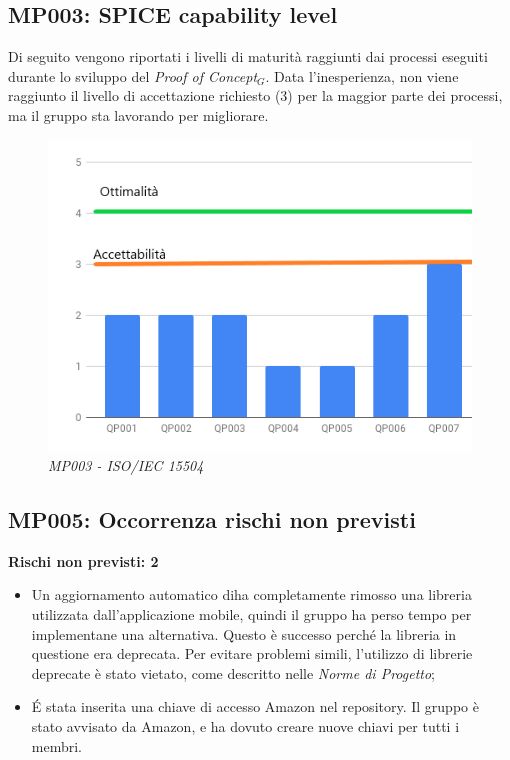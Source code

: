 \subsection{MP003: SPICE capability level}
Di seguito vengono riportati i livelli di maturità raggiunti dai processi eseguiti durante lo sviluppo del \textit{Proof of Concept$_{G}$}. Data l'inesperienza, non viene raggiunto il livello di accettazione richiesto (3) per la maggior parte dei processi, ma il gruppo sta lavorando per migliorare.
\begin{figure} [h]
    \centering
	\includegraphics[scale=0.5]{./images/15504.png}
    \caption{\textit{MP003 - ISO/IEC 15504 }}\label{}
\end{figure}

\subsection{MP005:  Occorrenza rischi non previsti}
\textbf{Rischi non previsti: 2}
\begin{itemize}
	\item Un aggiornamento automatico diha completamente rimosso una libreria utilizzata dall'applicazione mobile, quindi il gruppo ha perso tempo per implementane una alternativa. Questo è successo perché la libreria in questione era deprecata. Per evitare problemi simili, l'utilizzo di librerie deprecate è stato vietato, come descritto nelle \textit{Norme di Progetto};
	\item É stata inserita una chiave di accesso Amazon nel repository. Il gruppo è stato avvisato da Amazon, e ha dovuto creare nuove chiavi per tutti i membri.
\end{itemize}

